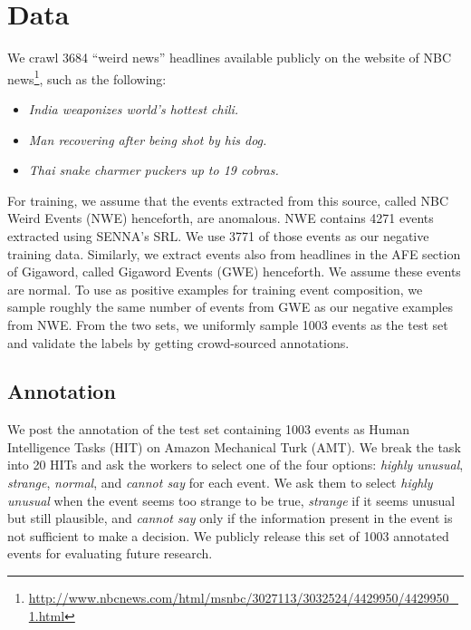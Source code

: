 \section{Data}
We crawl 3684 ``weird news'' headlines available publicly 
on the website of NBC
news\footnote{\url{http://www.nbcnews.com/html/msnbc/3027113/3032524/4429950/4429950_1.html}}, 
such as the following: 
\begin{itemize}
 \item[] \textit{India weaponizes world's hottest chili.}
 \item[] \textit{Man recovering after being shot by his dog.}
 \item[] \textit{Thai snake charmer puckers up to 19 cobras.}
\end{itemize}
For training, we assume that the events extracted from this source, called NBC Weird Events
(NWE) henceforth, are anomalous.  NWE contains 4271 events extracted using 
SENNA's \citep{collobert2011natural} SRL\@.  We use 3771 of those events as our negative training data. 
Similarly, we extract events also from
headlines in the AFE section of Gigaword, called Gigaword Events (GWE)
henceforth.  We assume these events are normal.
To use as positive examples for training event composition, we sample roughly
the same number of events from 
GWE as our negative examples from NWE\@. From the two sets, we uniformly sample 
1003 events
as the test set and validate the labels by getting crowd-sourced annotations.

\subsection{Annotation}\label{sec:nem_annot}
We post the annotation of the test set containing 1003 events as
Human Intelligence Tasks (HIT) on Amazon Mechanical Turk (AMT).
We break the task into 20 HITs and ask the workers to select one of the 
four options: \textit{highly unusual}, \textit{strange}, \textit{normal}, and 
\textit{cannot say} for each event.  We ask them to select \textit{highly
unusual} when the 
event seems too strange to be true, \textit{strange} if it seems unusual but 
still plausible, and \textit{cannot say} only if the information present in the 
event is not sufficient to make a decision.  We publicly release this set of 
1003
annotated events for evaluating future research.

